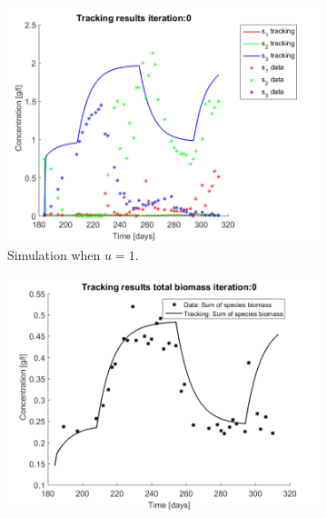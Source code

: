 \documentclass[3p,times]{elsarticle}
\begin{document}
\begin{figure}[h]
	\centering
	\begin{subfigure}{0.45 \textwidth}
	\includegraphics[width= \textwidth]{Application//191218_Reactor_A_metabolites_Iter_0}
	\caption{Simulation when $u=1$. }
	\label{u=1_metabolites}
	\end{subfigure}
	\begin{subfigure}{0.45 \textwidth}
	\includegraphics[width=\textwidth]{Application//191218_Reactor_A_Biomass_iter_0}
	\label{biomass_no_control}
	\end{subfigure}
\end{figure}
\end{document}
